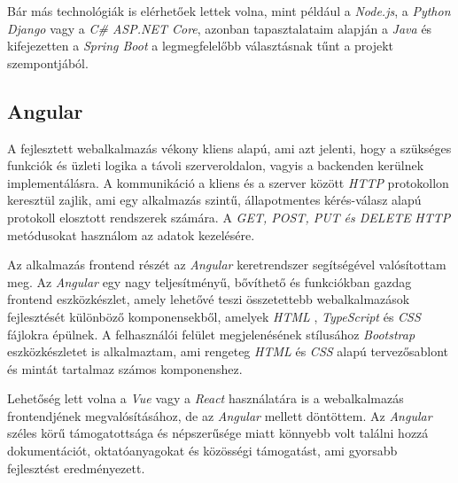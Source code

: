 Bár más technológiák is elérhetőek lettek volna, mint például a \textit{Node.js}, a \textit{Python} \textit{Django} vagy a \textit{C\# ASP.NET Core},  azonban tapasztalataim alapján a \textit{Java} \cite{java} és kifejezetten a \textit{Spring Boot} \cite{spring_boot} a legmegfelelőbb választásnak tűnt a projekt szempontjából.

\subsection{Angular}

A fejlesztett webalkalmazás vékony kliens alapú, ami azt jelenti, hogy a szükséges funkciók és üzleti logika a távoli szerveroldalon, vagyis a backenden kerülnek implementálásra. A kommunikáció a kliens és a szerver között \textit{HTTP} \cite{http} protokollon keresztül zajlik, ami egy alkalmazás szintű, állapotmentes kérés-válasz alapú protokoll elosztott rendszerek számára. A \textit{GET, POST, PUT és DELETE} \textit{HTTP} metódusokat használom az adatok kezelésére.

Az alkalmazás frontend részét az \textit{Angular} \cite{angular} keretrendszer segítségével valósítottam meg. Az \textit{Angular} egy nagy teljesítményű, bővíthető és funkciókban gazdag frontend eszközkészlet, amely lehetővé teszi összetettebb webalkalmazások fejlesztését különböző komponensekből, amelyek \textit{HTML} \cite{html}, \textit{TypeScript} \cite{ts} és \textit{CSS} \cite{css} fájlokra épülnek. A felhasználói felület megjelenésének stílusához \textit{Bootstrap} \cite{bootstrap} eszközkészletet is alkalmaztam, ami rengeteg \textit{HTML} és \textit{CSS} alapú tervezősablont és mintát tartalmaz számos komponenshez.

Lehetőség lett volna a \textit{Vue} \cite{vue} vagy a \textit{React} \cite{react} használatára is a webalkalmazás frontendjének megvalósításához, de az \textit{Angular} \cite{angular} mellett döntöttem. Az \textit{Angular} széles körű támogatottsága és népszerűsége miatt könnyebb volt találni hozzá dokumentációt, oktatóanyagokat és közösségi támogatást, ami gyorsabb fejlesztést eredményezett.
